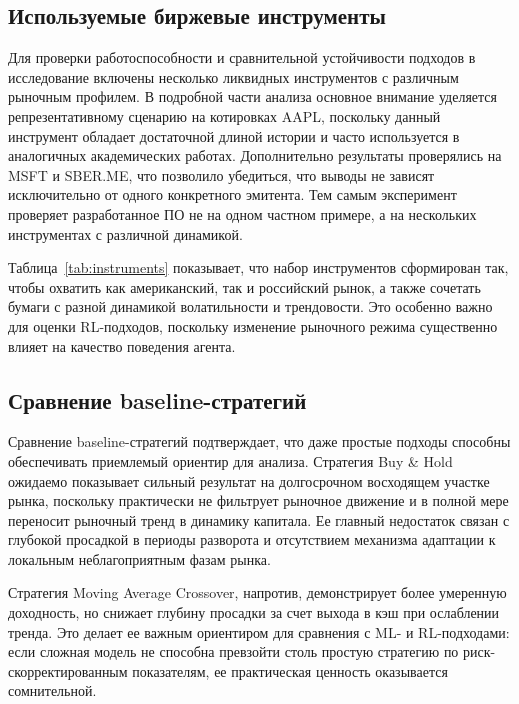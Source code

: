 \subsection{Используемые биржевые инструменты}

Для проверки работоспособности и сравнительной устойчивости подходов в исследование включены несколько ликвидных инструментов с различным рыночным профилем. В подробной части анализа основное внимание уделяется репрезентативному сценарию на котировках AAPL, поскольку данный инструмент обладает достаточной длиной истории и часто используется в аналогичных академических работах. Дополнительно результаты проверялись на MSFT и SBER.ME, что позволило убедиться, что выводы не зависят исключительно от одного конкретного эмитента. Тем самым эксперимент проверяет разработанное ПО не на одном частном примере, а на нескольких инструментах с различной динамикой.

\begin{table}[H]
\caption{Инструменты, использованные в экспериментальном моделировании}
\label{tab:instruments}

\end{table}

Таблица~\ref{tab:instruments} показывает, что набор инструментов сформирован так, чтобы охватить как американский, так и российский рынок, а также сочетать бумаги с разной динамикой волатильности и трендовости. Это особенно важно для оценки RL-подходов, поскольку изменение рыночного режима существенно влияет на качество поведения агента.

\subsection{Сравнение baseline-стратегий}

Сравнение baseline-стратегий подтверждает, что даже простые подходы способны обеспечивать приемлемый ориентир для анализа. Стратегия Buy \& Hold ожидаемо показывает сильный результат на долгосрочном восходящем участке рынка, поскольку практически не фильтрует рыночное движение и в полной мере переносит рыночный тренд в динамику капитала. Ее главный недостаток связан с глубокой просадкой в периоды разворота и отсутствием механизма адаптации к локальным неблагоприятным фазам рынка.

Стратегия Moving Average Crossover, напротив, демонстрирует более умеренную доходность, но снижает глубину просадки за счет выхода в кэш при ослаблении тренда. Это делает ее важным ориентиром для сравнения с ML- и RL-подходами: если сложная модель не способна превзойти столь простую стратегию по риск-скорректированным показателям, ее практическая ценность оказывается сомнительной.

